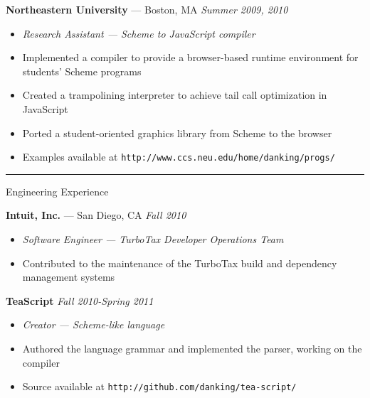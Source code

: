 \documentclass[10pt]{letter}
\begin{document}
\begin{tabbing}
{\large \bf Northeastern University} --- Boston, MA \` \textit{Summer 2009, 2010}

\end{tabbing}
\begin{itemize}
\setlength\itemsep{1pt}
\item [] \textit{Research Assistant --- Scheme to JavaScript compiler}
\item Implemented a compiler to provide a browser-based runtime environment for students' Scheme programs
\item Created a trampolining interpreter to achieve tail call optimization in JavaScript
\item Ported a student-oriented graphics library from Scheme to the browser
\item Examples available at \texttt{http://www.ccs.neu.edu/home/danking/progs/}
\end{itemize}

\rule{\linewidth}{.5pt}

{\Large Engineering Experience}

\begin{tabbing}
{\large \bf Intuit, Inc.} --- San Diego, CA \` \textit{Fall 2010}

\end{tabbing}

\begin{itemize}
\setlength\itemsep{1pt}
\item [] {\textit{Software Engineer --- TurboTax Developer Operations Team}}
\item{Contributed to the maintenance of the TurboTax build and dependency
  management systems}
\end{itemize}


\begin{tabbing}
{\large \bf TeaScript} \` \textit{Fall 2010-Spring 2011}
\end{tabbing}

\begin{itemize}
\setlength\itemsep{1pt}
\item [] {\textit{Creator --- Scheme-like language}}
\item{Authored the language grammar and implemented the parser, working on the
  compiler}
\item{Source available at \texttt{http://github.com/danking/tea-script/}}
\end{itemize}
\end{document}
